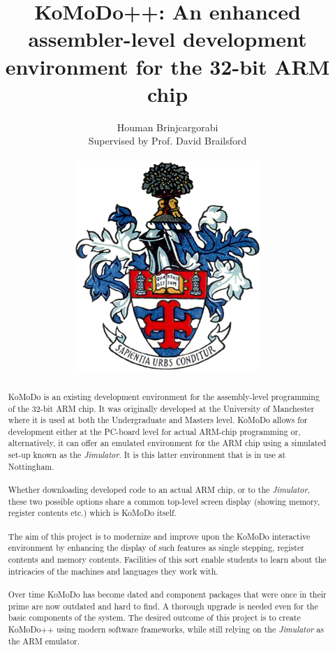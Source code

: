 \documentclass[]{article}
\title{KoMoDo++: An enhanced assembler-level development environment for the 32-bit ARM chip}
\author{Houman Brinjcargorabi\\Supervised by Prof. David Brailsford\\\\\includegraphics[scale=0.4]{UoN_arms}}%
\newcommand{\itl}[1]{\textit{#1}}
\begin{document}
\thispagestyle{empty}

\maketitle{}
\begin{abstract}
\noindent KoMoDo is an existing development environment for the assembly-level programming of the 32-bit ARM chip. It was originally developed at the University of Manchester where it is used at both the Undergraduate and Masters level. KoMoDo allows for development either at the PC-board level for actual ARM-chip programming or, alternatively, it can offer an emulated environment for the ARM chip using a simulated set-up known as the \itl{Jimulator}. It is this latter environment that is in use at Nottingham.\\\\
%
Whether downloading developed code to an actual ARM chip, or to the \itl{Jimulator}, these two possible options share a common top-level screen display (showing memory, register contents etc.) which is KoMoDo itself.\\\\
%
The aim of this project is to modernize and improve upon the KoMoDo interactive environment by enhancing the display of such features as single stepping, register contents and memory contents. Facilities of this sort enable students to learn about the intricacies of the machines and languages they work with.\\\\
%
Over time KoMoDo has become dated and component packages that were once in their prime are now outdated and hard to find. A thorough upgrade is needed even for the basic components of the system. The desired outcome of this project is to create KoMoDo++ using modern software frameworks, while still relying on the \itl{Jimulator} as the ARM emulator.\\\\


\end{abstract}
\end{document}
